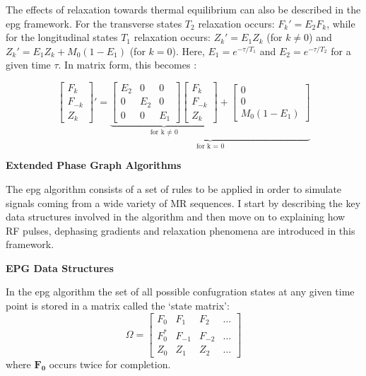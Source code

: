 The effects of relaxation towards thermal equilibrium can also be described in the \ac{epg} framework.
For the transverse states $T_2$ relaxation occurs: $F_k' = E_2 F_k$, while for the longitudinal states $T_1$ relaxation occurs: $Z_k' = E_1 Z_k$ (for $k \neq 0$)
and $Z_k' = E_1 Z_k + M_0(1 - E_1)$ (for $k = 0$).
Here, $E_1 = e^{-\tau/T_1}$ and $E_2 = e^{-\tau/T_2}$ for a given time $\tau$.
In matrix form, this becomes \cite{Hennig1991}:

\begin{equation}\label{eq:woessnerFn}
    \begin{bmatrix}
        F_k      \\
        F_{-k} \\
        Z_k
    \end{bmatrix}' = 
    \underbrace{
    \underbrace{\begin{bmatrix}
        E_2 & 0 & 0 \\
        0 & E_2 & 0 \\
        0 & 0 & E_1 
    \end{bmatrix}
    \begin{bmatrix}
        F_k      \\
        F_{-k} \\
        Z_k
    \end{bmatrix}}_\text{for k $\neq$ 0}
    +
    \begin{bmatrix}
        0 \\
        0 \\
        M_0 (1 - E_1)
    \end{bmatrix}}_\text{for k = 0}
\end{equation}

\hfill

\large \textbf{Extended Phase Graph Algorithms} \normalsize

The \ac{epg} algorithm consists of a set of rules to be applied in order to simulate signals coming from a wide variety of MR sequences.
I start by describing the key data structures involved in the algorithm and then move on to explaining how RF pulses, dephasing gradients and relaxation phenomena are introduced in this framework.

\hfill

\textbf{EPG Data Structures}

In the \ac{epg} algorithm the set of all possible confugration states at any given time point is stored in a matrix called the `state matrix':
\begin{equation}
    \Omega = 
    \begin{bmatrix}
    F_0 & F_1 & F_2 & \dots \\
    F_0^* & F_{-1} & F_{-2} & \dots \\
    Z_0 & Z_1 & Z_2 & \dots 
    \end{bmatrix}
\end{equation}
where $\bm{F_0}$ occurs twice for completion.

